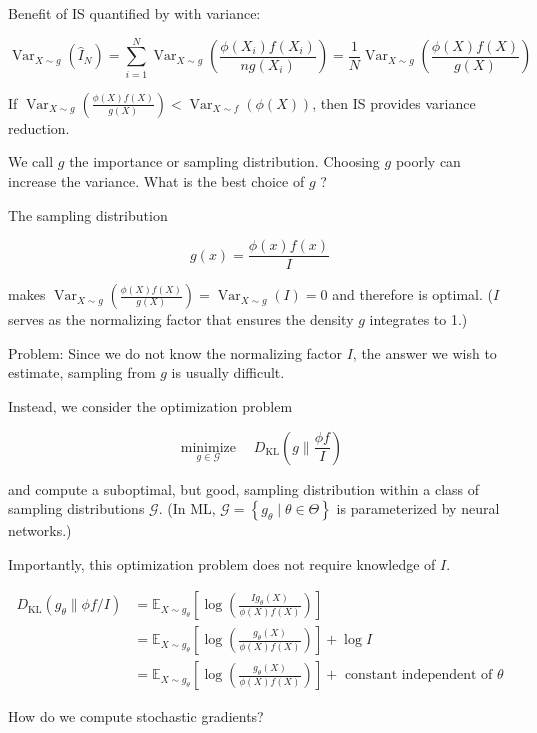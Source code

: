 \begin{concept}
    Benefit of IS quantified by with variance:

    $$
    \operatorname{Var}_{X \sim g}\left(\hat{I}_{N}\right)=\sum_{i=1}^{N} \operatorname{Var}_{X \sim g}\left(\frac{\phi\left(X_{i}\right) f\left(X_{i}\right)}{n g\left(X_{i}\right)}\right)=\frac{1}{N} \operatorname{Var}_{X \sim g}\left(\frac{\phi(X) f(X)}{g(X)}\right)
    $$

    If $\operatorname{Var}_{X \sim g}\left(\frac{\phi(X) f(X)}{g(X)}\right)<\operatorname{Var}_{X \sim f}(\phi(X))$, then IS provides variance reduction.

    We call $g$ the importance or sampling distribution. Choosing $g$ poorly can increase the variance. What is the best choice of $g$ ?

    \par\noindent\textcolor{gray}{\hdashrule{\textwidth}{0.4pt}{1pt 2pt}}

    The sampling distribution

    $$
    g(x)=\frac{\phi(x) f(x)}{I}
    $$

    makes $\operatorname{Var}_{X \sim g}\left(\frac{\phi(X) f(X)}{g(X)}\right)=\operatorname{Var}_{X \sim g}(I)=0$ and therefore is optimal. ($I$ serves as the normalizing factor that ensures the density $g$ integrates to 1.)

    Problem: Since we do not know the normalizing factor $I$, the answer we wish to estimate, sampling from $g$ is usually difficult.
\end{concept}

\begin{concept}
    Instead, we consider the optimization problem

    $$
    \underset{g \in \mathcal{G}}{\operatorname{minimize}} \quad D_{\mathrm{KL}}\left(g \| \frac{\phi f}{I}\right)
    $$

    and compute a suboptimal, but good, sampling distribution within a class of sampling distributions $\mathcal{G}$. (In ML, $\mathcal{G}=\left\{g_{\theta} \mid \theta \in \Theta\right\}$ is parameterized by neural networks.)

    Importantly, this optimization problem does not require knowledge of $I$.

    $$
    \begin{aligned}
    D_{\mathrm{KL}}\left(g_{\theta} \| \phi f / I\right) & =\mathbb{E}_{X \sim g_{\theta}}\left[\log \left(\frac{I g_{\theta}(X)}{\phi(X) f(X)}\right)\right] \\
    & =\mathbb{E}_{X \sim g_{\theta}}\left[\log \left(\frac{g_{\theta}(X)}{\phi(X) f(X)}\right)\right]+\log I \\
    & =\mathbb{E}_{X \sim g_{\theta}}\left[\log \left(\frac{g_{\theta}(X)}{\phi(X) f(X)}\right)\right]+\text { constant independent of } \theta
    \end{aligned}
    $$

    How do we compute stochastic gradients?
\end{concept}

